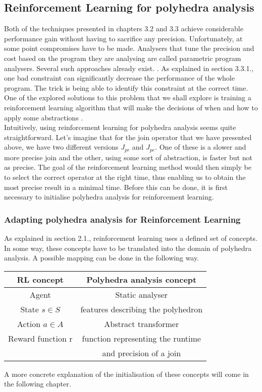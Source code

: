 \subsection{Reinforcement Learning for polyhedra analysis}
Both of the techniques presented in chapters 3.2 and 3.3 achieve considerable performance gain without having to sacrifice any precision. Unfortunately, at some point compromises have to be made. Analysers that tune the precision and cost based on the program they are analysing are called parametric program analysers. Several such approaches already exist. \cite{oh2015learning,liang2011learning,heo2016learning}.
As explained in section 3.3.1., one bad constraint can significantly decrease the performance of the whole program. The trick is being able to identify this constraint at the correct time. One of the explored solutions to this problem that we shall explore is training a reinforcement learning algorithm  that will make the decisions of when and how to apply some abstractions \cite{singh2018fast}.\\
Intuitively, using reinforcement learning for polyhedra analysis seems quite straightforward. Let's imagine that for the join operator that we have presented above, we have two different versions $J_{pr}$ and $J_{pe}$. One of these is a slower and more precise join and the other, using some sort of abstraction, is faster but not as precise. The goal of the reinforcement learning method would then simply be to select the correct operator at the right time, thus enabling us to obtain the most precise result in a minimal time. Before this can be done, it is first necessary to initialise polyhedra analysis for reinforcement learning.

\subsubsection{Adapting polyhedra analysis for Reinforcement Learning}
As explained in section 2.1., reinforcement learning uses a defined set of concepts. In some way, these concepts have to be translated into the domain of polyhedra analysis. A possible mapping can be done in the following way.
\begin{center}
\begin{tabular}{||c c||} 
 \hline
 RL concept & Polyhedra analysis concept  \\ [0.5ex] 
 \hline
 \hline
 Agent & Static analyser\\ 

 State $s\in S$ & features describing the polyhedron\\

 Action $a \in A$ & Abstract transformer \\
 
 Reward function r & function representing the runtime\\
 
  & and precision of a join\\
 \hline
\end{tabular}
\end{center}
A more concrete explanation of the initialisation of these concepts will come in the following chapter.

